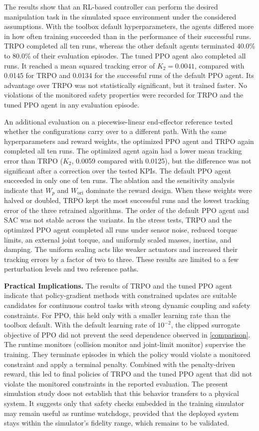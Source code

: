 \documentclass{ieeeaccess}
\begin{document}
The results show that an RL-based controller can perform the desired manipulation task in the simulated
space environment under the considered assumptions. With the toolbox default hyperparameters, the agents
differed more in how often training succeeded than in the performance of their successful runs. TRPO
completed all ten runs, whereas the other default agents terminated 40.0\% to 80.0\% of their evaluation
episodes. The tuned PPO agent also completed all runs. It reached a mean squared tracking error of
$K_2 = 0.0041$, compared with 0.0145 for TRPO and 0.0134 for the successful runs of the default PPO
agent. Its advantage over TRPO was not statistically significant, but it trained faster. No violations
of the monitored safety properties were recorded for TRPO and the tuned PPO agent in any evaluation
episode.

An additional evaluation on a piecewise-linear end-effector reference tested whether the configurations
carry over to a different path. With the same hyperparameters and reward weights, the optimized PPO agent
and TRPO again completed all ten runs. The optimized agent again had a lower mean tracking error than
TRPO ($K_2$, 0.0059 compared with 0.0125), but the difference was not significant after a correction
over the tested KPIs. The default PPO agent succeeded in only one of ten runs. The ablation and the
sensitivity analysis indicate that $W_p$ and $W_{\mathrm{ori}}$ dominate the reward design. When these
weights were halved or doubled, TRPO kept the most successful runs and the lowest tracking error of the
three retrained algorithms. The order of the default PPO agent and SAC was not stable across the
variants. In the stress tests, TRPO and the optimized PPO agent completed all runs under sensor noise,
reduced torque limits, an external joint torque, and uniformly scaled masses, inertias, and damping. The
uniform scaling acts like weaker actuators and increased their tracking errors by a factor of two to
three. These results are limited to a few perturbation levels and two reference paths.

\textbf{Practical Implications.} The results of TRPO and the tuned PPO agent indicate that
policy-gradient methods with constrained updates are suitable candidates for continuous control tasks
with strong dynamic coupling and safety constraints. For PPO, this held only with a smaller learning rate
than the toolbox default. With the default learning rate of $10^{-2}$, the clipped surrogate objective of
PPO did not prevent the seed dependence observed in \cref{comparison}. The runtime monitors (collision
monitor and joint-limit monitor) supervise the training. They terminate episodes in which the policy
would violate a monitored constraint and apply a terminal penalty. Combined with the penalty-driven
reward, this led to final policies of TRPO and the tuned PPO agent that did not violate the monitored
constraints in the reported evaluation. The present simulation study does not establish that this
behavior transfers to a physical system. It suggests only that safety checks embedded in the training
simulator may remain useful as runtime watchdogs, provided that the deployed system stays within the
simulator's fidelity range, which remains to be validated.
\end{document}
